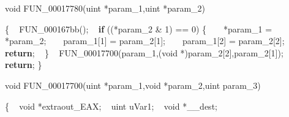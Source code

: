 \documentclass[
]{article}
\newenvironment{Shaded}{}{}
\newcommand{\ControlFlowTok}[1]{\textcolor[rgb]{0.00,0.44,0.13}{\textbf{#1}}}
\newcommand{\DataTypeTok}[1]{\textcolor[rgb]{0.56,0.13,0.00}{#1}}
\newcommand{\DecValTok}[1]{\textcolor[rgb]{0.25,0.63,0.44}{#1}}
\newcommand{\NormalTok}[1]{#1}
\newcommand{\OperatorTok}[1]{\textcolor[rgb]{0.40,0.40,0.40}{#1}}
\begin{document}
\begin{Shaded}
\begin{Highlighting}[]
\DataTypeTok{void}\NormalTok{ FUN\_00017780}\OperatorTok{(}\NormalTok{uint }\OperatorTok{*}\NormalTok{param\_1}\OperatorTok{,}\NormalTok{uint }\OperatorTok{*}\NormalTok{param\_2}\OperatorTok{)}

\OperatorTok{\{}
\NormalTok{  FUN\_000167bb}\OperatorTok{();}
  \ControlFlowTok{if} \OperatorTok{((*}\NormalTok{param\_2 }\OperatorTok{\&} \DecValTok{1}\OperatorTok{)} \OperatorTok{==} \DecValTok{0}\OperatorTok{)} \OperatorTok{\{}
    \OperatorTok{*}\NormalTok{param\_1 }\OperatorTok{=} \OperatorTok{*}\NormalTok{param\_2}\OperatorTok{;}
\NormalTok{    param\_1}\OperatorTok{[}\DecValTok{1}\OperatorTok{]} \OperatorTok{=}\NormalTok{ param\_2}\OperatorTok{[}\DecValTok{1}\OperatorTok{];}
\NormalTok{    param\_1}\OperatorTok{[}\DecValTok{2}\OperatorTok{]} \OperatorTok{=}\NormalTok{ param\_2}\OperatorTok{[}\DecValTok{2}\OperatorTok{];}
    \ControlFlowTok{return}\OperatorTok{;}
  \OperatorTok{\}}
\NormalTok{  FUN\_00017700}\OperatorTok{(}\NormalTok{param\_1}\OperatorTok{,(}\DataTypeTok{void} \OperatorTok{*)}\NormalTok{param\_2}\OperatorTok{[}\DecValTok{2}\OperatorTok{],}\NormalTok{param\_2}\OperatorTok{[}\DecValTok{1}\OperatorTok{]);}
  \ControlFlowTok{return}\OperatorTok{;}
\OperatorTok{\}}

\DataTypeTok{void}\NormalTok{ FUN\_00017700}\OperatorTok{(}\NormalTok{uint }\OperatorTok{*}\NormalTok{param\_1}\OperatorTok{,}\DataTypeTok{void} \OperatorTok{*}\NormalTok{param\_2}\OperatorTok{,}\NormalTok{uint param\_3}\OperatorTok{)}

\OperatorTok{\{}
  \DataTypeTok{void} \OperatorTok{*}\NormalTok{extraout\_EAX}\OperatorTok{;}
\NormalTok{  uint uVar1}\OperatorTok{;}
  \DataTypeTok{void} \OperatorTok{*}\NormalTok{\_\_dest}\OperatorTok{;}


\end{Highlighting}
\end{Shaded}
\end{document}

